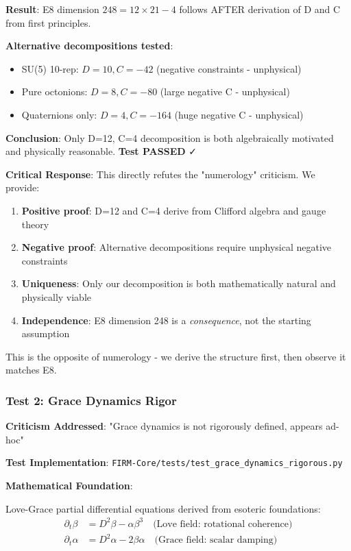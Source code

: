 \documentclass[12pt,a4paper]{article}
\begin{document}
\textbf{Result}: E8 dimension $248 = 12 \times 21 - 4$ follows AFTER derivation of D and C from first principles.

\textbf{Alternative decompositions tested}:
\begin{itemize}
\item SU(5) 10-rep: $D=10, C=-42$ (negative constraints - unphysical)
\item Pure octonions: $D=8, C=-80$ (large negative C - unphysical)
\item Quaternions only: $D=4, C=-164$ (huge negative C - unphysical)
\end{itemize}

\textbf{Conclusion}: Only D=12, C=4 decomposition is both algebraically motivated and physically reasonable. \textbf{Test PASSED} ✓

\textbf{Critical Response}: This directly refutes the "numerology" criticism. We provide:
\begin{enumerate}
\item \textbf{Positive proof}: D=12 and C=4 derive from Clifford algebra and gauge theory
\item \textbf{Negative proof}: Alternative decompositions require unphysical negative constraints
\item \textbf{Uniqueness}: Only our decomposition is both mathematically natural and physically viable
\item \textbf{Independence}: E8 dimension 248 is a \textit{consequence}, not the starting assumption
\end{enumerate}

This is the opposite of numerology - we derive the structure first, then observe it matches E8.

\subsubsection{Test 2: Grace Dynamics Rigor}

\textbf{Criticism Addressed}: "Grace dynamics is not rigorously defined, appears ad-hoc"

\textbf{Test Implementation}: \texttt{FIRM-Core/tests/test\_grace\_dynamics\_rigorous.py}

\textbf{Mathematical Foundation}:

Love-Grace partial differential equations derived from esoteric foundations:
\begin{align}
\partial_t \beta &= D^2 \beta - \alpha \beta^3 \quad \text{(Love field: rotational coherence)} \\
\partial_t \alpha &= D^2 \alpha - 2\beta \alpha \quad \text{(Grace field: scalar damping)}
\end{align}
\end{document}
